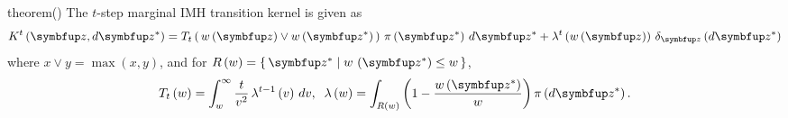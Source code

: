 
\begin{theoremEnd}{theorem}\label{thm:imh_exact_kernel}(\citealt[Theorem 1]{Smith96exacttransition})
  The \(t\)-step marginal IMH transition kernel is given as
  {\small
    \[
    K^t\left(\vz, d\vz^*\right) 
    = T_t\left(\, w\left(\vz\right) \vee w\left(\vz^*\right)\,\right) \, \pi\left(\vz^*\right) \, d\vz^*
    + \lambda^t\left(w\left(\vz\right)\right) \, \delta_{\vz}\left(d\vz^*\right)
    \]
  }%
  where {\small\(x \vee y = \max\left(x, y\right)\)}, and for {\small\(R\left(w\right) = \{\, \vz^* \mid w\,\left(\vz^*\right) \leq w \,\}\)},
  {\small%
  \begin{align*}
  T_t\left(w\right)      = \int_w^{\infty} \frac{t}{v^2} \, \lambda^{t-1}\left(v\right)\,dv,\;\;
  \lambda\left(w\right) = \int_{R\left(w\right)} \left( 1 - \frac{w\left(\vz^*\right)}{w}  \right) \pi\left(d\vz^*\right).
  \end{align*}
  }
\end{theoremEnd}

